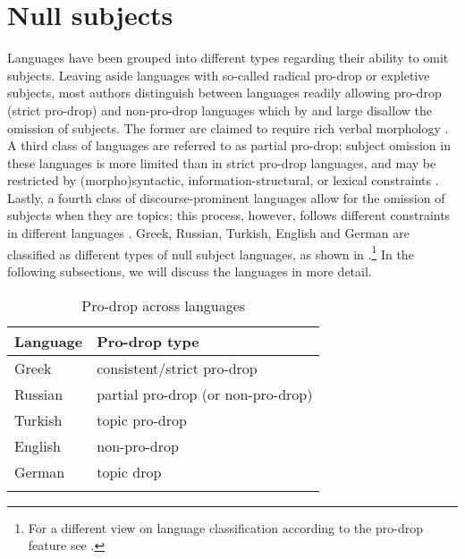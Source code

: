\documentclass[output=paper,colorlinks,citecolor=brown]{langscibook}
\begin{document}
\section{Null subjects} \label{sec:oezsoy:6Theory}
Languages have been grouped into different types regarding their ability to omit subjects. Leaving aside languages with so-called radical pro-drop or expletive subjects, most authors distinguish between languages readily allowing pro-drop (strict pro-drop) and non-pro-drop languages which by and large disallow the omission of subjects. The former are claimed to require rich verbal morphology \parencite{Perlmutter1971-PERDAS, holmberg2005there, RobertsHolmberg2010}. A third class of languages are referred to as partial pro-drop; subject omission in these languages is more limited than in strict pro-drop languages, and may be restricted by (morpho)syntactic, information-structural, or lexical constraints \parencite{holmberg2005there, RobertsHolmberg2010, Frascarelli2018, madariaga2018diachronic}. Lastly, a fourth class of discourse-prominent languages allow for the omission of subjects when they are topics; this process, however, follows different constraints in different
languages \parencite{taylan_Turkish_2001, Oeztuerk2008, schafer2021topic}.
Greek, Russian, Turkish, English and German are classified as different types of null subject languages, as shown in .\footnote{For a different view on language classification according to the pro-drop feature see \citet{wals-101}.} In the following subsections, we will discuss the languages in more detail.

\begin{table}
\begin{tabular}{ll}
\lsptoprule
Language & Pro-drop type   \\ \midrule
Greek    & consistent/strict pro-drop  \\ 
Russian  & partial pro-drop (or non-pro-drop) \\ 
Turkish  & topic pro-drop   \\ 
English  & non-pro-drop   \\ 
German   & topic drop   \\ 
\lspbottomrule
\end{tabular}
\caption{Pro-drop across languages}
\label{tab:oezsoy:ProDrop:TableLang}
\end{table}
\end{document}

